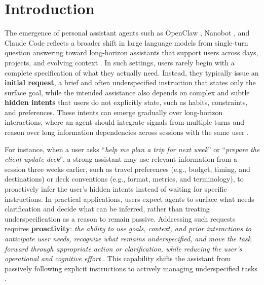
\section{Introduction}
\label{sec:intro}

The emergence of personal assistant agents such as OpenClaw \citep{openclaw}, Nanobot \citep{nanobot}, and Claude Code \citep{claudecode} reflects a broader shift in large language models from single-turn question answering toward long-horizon assistants that support users across days, projects, and evolving context \citep{mialon2023gaia,li2026clawsbench}. 
In such settings, users rarely begin with a complete specification of what they actually need. Instead, they typically issue an \textbf{initial request}, a brief and often underspecified instruction that states only the surface goal, while the intended assistance also depends on complex and subtle \textbf{hidden intents} that users do not explicitly state, such as habits, constraints, and preferences. These intents can emerge gradually over long-horizon interactions, where an agent should integrate signals from multiple turns and reason over long information dependencies across sessions with the same user \citep{kim2026persona2web,lyu2026personalalign,liu2026perma}.

For instance, when a user asks ``\textit{help me plan a trip for next week}'' or ``\textit{prepare the client update deck}'', a strong assistant may use relevant information from a session three weeks earlier, such as travel preferences (e.g., budget, timing, and destinations) or deck conventions (e.g., format, metrics, and terminology), to proactively infer the user's hidden intents instead of waiting for specific instructions.
In practical applications, users expect agents to surface what needs clarification and decide what can be inferred, rather than treating underspecification as a reason to remain passive.
Addressing such requests requires \textbf{proactivity}: \textit{the ability to use goals, context, and prior interactions to anticipate user needs, recognize what remains underspecified, and move the task forward through appropriate action or clarification, while reducing the user’s operational and cognitive effort} \citep{sun2026ambibench,kong2026proactivemobile,kaur2026proper}. 
This capability shifts the assistant from passively following explicit instructions to actively managing underspecified tasks \citep{xie2026pask}.

